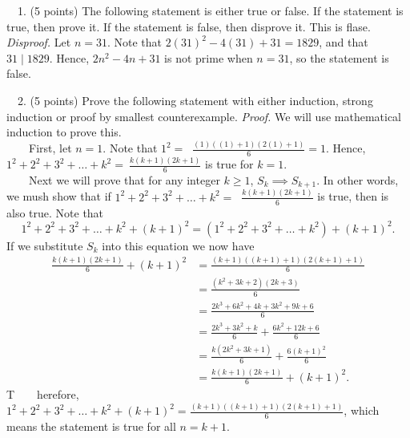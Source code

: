 \documentclass[letterpaper,10pt]{article}
\begin{document}
\flushleft
~~1. (5 points) The following statement is either true or false. If the statement is
true, then prove it. If the statement is false, then disprove it.
\flushleft
This is flase. \\
\emph{Disproof.} Let $n=31$. Note that $2(31)^{2}-4(31)+31=1829$, and that
$31\mid1829$. Hence, $2n^{2}-4n + 31$ is not prime when $n=31$, so
the statement is false.
\newline

~~2. (5 points) Prove the following statement with either induction, strong
induction or proof by smallest counterexample.
\flushleft
\emph{Proof.} We will use mathematical induction to prove this. \\
~~~~First, let $n=1$. Note that $1^{2} =$
    \(\ \frac{(1)((1) + 1)(2(1) + 1)}{6} = 1\). Hence,
    $1^{2} + 2^{2} + 3^{2} +\ldots+ k^{2} =$\(\ \frac{k
    (k + 1)(2k + 1)}{6}\) is true for $k = 1$. \\
~~~~Next we will prove that for any integer $k \geq 1$, $S_{k} \implies S_{k+1}$.
    In other words, we mush show that if $1^{2} + 2^{2} + 3^{2} +\ldots+ k^{2} =$
    \(\ \frac{k(k + 1)(2k + 1)}{6}\) is true, then 
    \flushleft is also true. Note that\[
        1^{2} + 2^{2} + 3^{2} + \ldots +k^{2}+(k+1)^{2} =
        (1^{2} + 2^{2} + 3^{2} +\ldots+k^{2})+(k+1)^{2}. \]
        If we substitute $S_k$ into this equation we now have
    \begin{align*}
        \frac{k(k + 1)(2k + 1)}{6} + (k+1)^{2} &=
        \frac{(k+1)((k+1) + 1)(2(k+1) + 1)}{6} \\
        ~ &= \frac{(k^{2}+3k+2)(2k+3)}{6} \\
        ~ &= \frac{2k^{3}+6k^{2}+4k+3k^{2}+9k+6}{6} \\
        ~ &= \frac{2k^{3}+3k^{2}+k}{6}+\frac{6k^{2}+12k+6}{6} \\
        ~ &= \frac{k(2k^{2}+3k+1)}{6}+\frac{6(k+1)^{2}}{6} \\
        ~ &= \frac{k(k+1)(2k+1)}{6}+(k+1)^{2}.
    \end{align*}
T~~~~herefore, $1^{2} + 2^{2} + 3^{2} +\ldots+
k^{2}+(k+1)^{2} = \frac{(k+1)((k+1) + 1)(2(k+1) + 1)}{6}$, which
means the statement is true for all $n=k+1$.
\end{document}
